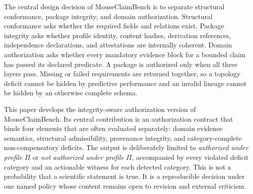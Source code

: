 The central design decision of MouseClaimBench is to separate structural conformance, package integrity, and domain authorization. Structural conformance asks whether the required fields and relations exist. Package integrity asks whether profile identity, content hashes, derivation references, independence declarations, and attestations are internally coherent. Domain authorization asks whether every mandatory evidence block for a bounded claim has passed its declared predicate. A package is authorized only when all three layers pass. Missing or failed requirements are returned together, so a topology deficit cannot be hidden by predictive performance and an invalid lineage cannot be hidden by an otherwise complete schema.

This paper develops the integrity-aware authorization version of MouseClaimBench. Its central contribution is an authorization contract that binds four elements that are often evaluated separately: domain evidence semantics, structural admissibility, provenance integrity, and category-complete non-compensatory deficits. The output is deliberately limited to \emph{authorized under profile $\Pi$} or \emph{not authorized under profile $\Pi$}, accompanied by every violated deficit category and an actionable witness for each detected category. This is not a probability that a scientific statement is true. It is a reproducible decision under one named policy whose content remains open to revision and external criticism.

